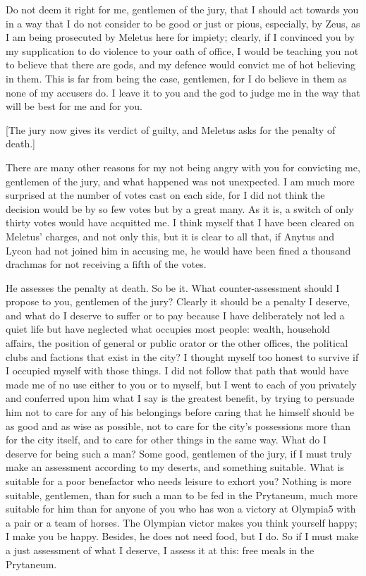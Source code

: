 Do not deem it right for me, gentlemen of the jury, that I should act towards you in a way that
I do not consider to be good or just or pious, especially, by Zeus, as I am being prosecuted by
Meletus here for impiety; clearly, if I convinced you by my supplication to do violence to your
oath of office, I would be teaching you not to believe that there are gods, and my defence would
convict me of hot believing in them. This is far from being the case, gentlemen, for I do believe
in them as none of my accusers do. I leave it to you and the god to judge me in the way that will
be best for me and for you.

[The jury now gives its verdict of guilty, and Meletus asks for the penalty of death.]

There are many other reasons for my not being angry with you for convicting me, gentlemen
of the jury, and what happened was not unexpected. I am much more surprised at the number of
votes cast on each side, for I did not think the decision would be by so few votes but by a great
many. As it is, a switch of only thirty votes would have acquitted me. I think myself that I have
been cleared on Meletus' charges, and not only this, but it is clear to all that, if Anytus and Lycon 
had not joined him in accusing me, he would have been fined a thousand drachmas for not
receiving a fifth of the votes.

He assesses the penalty at death. So be it. What counter-assessment should I propose to you,
gentlemen of the jury? Clearly it should be a penalty I deserve, and what do I deserve to suffer or
to pay because I have deliberately not led a quiet life but have neglected what occupies most
people: wealth, household affairs, the position of general or public orator or the other offices, the
political clubs and factions that exist in the city? I thought myself too honest to survive if I
occupied myself with those things. I did not follow that path that would have made me of no use
either to you or to myself, but I went to each of you privately and conferred upon him what I say
is the greatest benefit, by trying to persuade him not to care for any of his belongings before caring
that he himself should be as good and as wise as possible, not to care for the city's possessions
more than for the city itself, and to care for other things in the same way. What do I deserve for
being such a man? Some good, gentlemen of the jury, if I must truly make an assessment according
to my deserts, and something suitable. What is suitable for a poor benefactor who needs leisure
to exhort you? Nothing is more suitable, gentlemen, than for such a man to be fed in the
Prytaneum, much more suitable for him than for anyone of you who has won a victory at Olympia5
with a pair or a team of horses. The Olympian victor makes you think yourself happy; I make you
be happy. Besides, he does not need food, but I do. So if I must make a just assessment of what
I deserve, I assess it at this: free meals in the Prytaneum.

